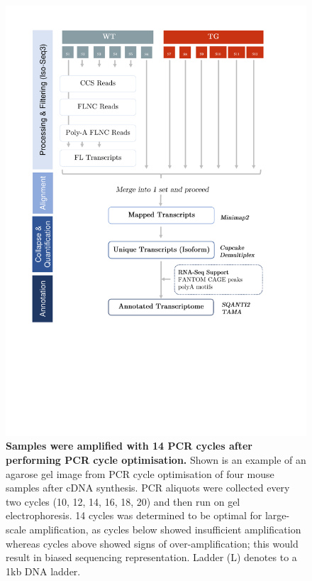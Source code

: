 \vspace{1cm}
\begin{figure}[!htp]
	\centering
	\includegraphics[page=2,trim={2.5cm 25cm 0cm 0cm},clip,scale = 1]{Figures/WholeTranscriptome_Figures.pdf}
	\captionsetup{width=0.95\textwidth}
	\caption[Iso-Seq global transcriptome profiling - PCR cycle optimisation]%
	{\textbf{Samples were amplified with 14 PCR cycles after performing PCR cycle optimisation.} Shown is an example of an agarose gel image from PCR cycle optimisation of four mouse samples after cDNA synthesis. PCR aliquots were collected every two cycles (10, 12, 14, 16, 18, 20) and then run on gel electrophoresis. 14 cycles was determined to be optimal for large-scale amplification, as cycles below showed insufficient amplification whereas cycles above showed signs of over-amplification; this would result in biased sequencing representation. Ladder (L) denotes to a 1kb DNA ladder.}
	\label{fig:isoseq_whole_pccresults}
\end{figure}

